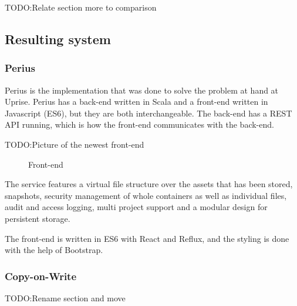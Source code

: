 \documentclass[a4paper,12pt]{article}
\newcommand{\fix}{\colorbox{yellow!30}{TODO:}}
\begin{document}
\fix Relate section more to comparison

\subsection{Resulting system}
\subsubsection{Perius}
Perius is the implementation that was done to solve the problem at hand at Uprise. Perius has a
back-end written in Scala and a front-end written in Javascript (ES6), but they are both
interchangeable.  The back-end has a REST API running, which is how the front-end communicates with
the back-end.

\fix Picture of the newest front-end
\begin{figure}[htp] 
    \caption{Front-end~\cite{BTRFS}}
    \label{fig:frontend}
\end{figure}


The service features a virtual file structure over the assets that has been stored, snapshots,
security management of whole containers as well as individual files, audit and access logging, multi
project support and a modular design for persistent storage.

The front-end is written in ES6 with React and Reflux, and the styling is done with the help of
Bootstrap.

\subsubsection{Copy-on-Write}
\fix Rename section and move
\end{document}

